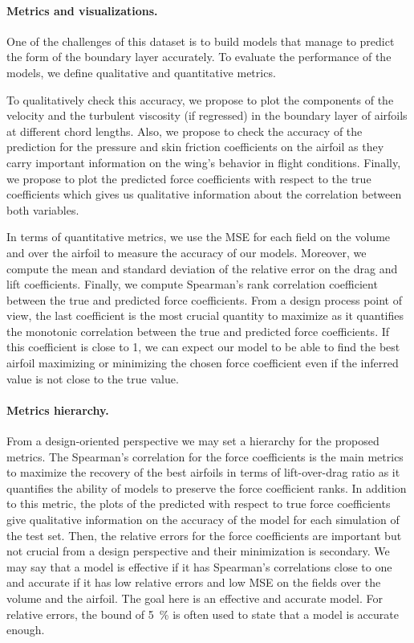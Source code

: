 \paragraph{Metrics and visualizations.} One of the challenges of this dataset is to build models that manage to predict the form of the boundary layer accurately. To evaluate the performance of the models, we define qualitative and quantitative metrics.

To qualitatively check this accuracy, we propose to plot the components of the velocity and the turbulent viscosity (if regressed) in the boundary layer of airfoils at different chord lengths. Also, we propose to check the accuracy of the prediction for the pressure and skin friction coefficients on the airfoil as they carry important information on the wing's behavior in flight conditions. Finally, we propose to plot the predicted force coefficients with respect to the true coefficients which gives us qualitative information about the correlation between both variables. 

In terms of quantitative metrics, we use the MSE for each field on the volume and over the airfoil to measure the accuracy of our models. Moreover, we compute the mean and standard deviation of the relative error on the drag and lift coefficients. Finally, we compute Spearman's rank correlation coefficient between the true and predicted force coefficients. From a design process point of view, the last coefficient is the most crucial quantity to maximize as it quantifies the monotonic correlation between the true and predicted force coefficients. If this coefficient is close to 1, we can expect our model to be able to find the best airfoil maximizing or minimizing the chosen force coefficient even if the inferred value is not close to the true value.

\paragraph{Metrics hierarchy.} From a design-oriented perspective we may set a hierarchy for the proposed metrics. The Spearman's correlation for the force coefficients is the main metrics to maximize the recovery of the best airfoils in terms of lift-over-drag ratio as it quantifies the ability of models to preserve the force coefficient ranks. In addition to this metric, the plots of the predicted with respect to true force coefficients give qualitative information on the accuracy of the model for each simulation of the test set. Then, the relative errors for the force coefficients are important but not crucial from a design perspective and their minimization is secondary. We may say that a model is effective if it has Spearman's correlations close to one and accurate if it has low relative errors and low MSE on the fields over the volume and the airfoil. The goal here is an effective and accurate model. For relative errors, the bound of \SI{5}{\percent} is often used to state that a model is accurate enough.

